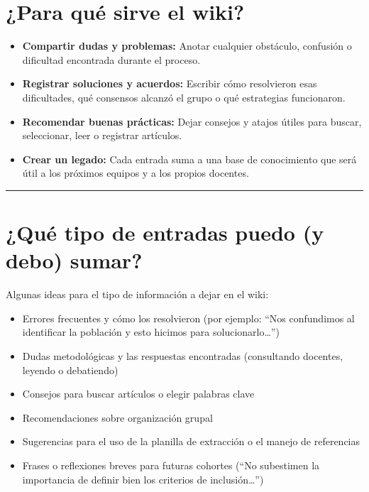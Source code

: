 \documentclass[
  letterpaper,
]{book}
\providecommand{\tightlist}{%
  \setlength{\itemsep}{0pt}\setlength{\parskip}{0pt}}\usepackage{longtable,booktabs,array}
\begin{document}
\section{¿Para qué sirve el wiki?}\label{para-quuxe9-sirve-el-wiki}

\begin{itemize}
\tightlist
\item
  \textbf{Compartir dudas y problemas:} Anotar cualquier obstáculo,
  confusión o dificultad encontrada durante el proceso.
\item
  \textbf{Registrar soluciones y acuerdos:} Escribir cómo resolvieron
  esas dificultades, qué consensos alcanzó el grupo o qué estrategias
  funcionaron.
\item
  \textbf{Recomendar buenas prácticas:} Dejar consejos y atajos útiles
  para buscar, seleccionar, leer o registrar artículos.
\item
  \textbf{Crear un legado:} Cada entrada suma a una base de conocimiento
  que será útil a los próximos equipos y a los propios docentes.
\end{itemize}

\begin{center}\rule{0.5\linewidth}{0.5pt}\end{center}

\section{¿Qué tipo de entradas puedo (y debo)
sumar?}\label{quuxe9-tipo-de-entradas-puedo-y-debo-sumar}

Algunas ideas para el tipo de información a dejar en el wiki:

\begin{itemize}
\tightlist
\item
  Errores frecuentes y cómo los resolvieron (por ejemplo: ``Nos
  confundimos al identificar la población y esto hicimos para
  solucionarlo\ldots{}'')
\item
  Dudas metodológicas y las respuestas encontradas (consultando
  docentes, leyendo o debatiendo)
\item
  Consejos para buscar artículos o elegir palabras clave
\item
  Recomendaciones sobre organización grupal
\item
  Sugerencias para el uso de la planilla de extracción o el manejo de
  referencias
\item
  Frases o reflexiones breves para futuras cohortes (``No subestimen la
  importancia de definir bien los criterios de inclusión\ldots{}'')
\end{itemize}
\end{document}
